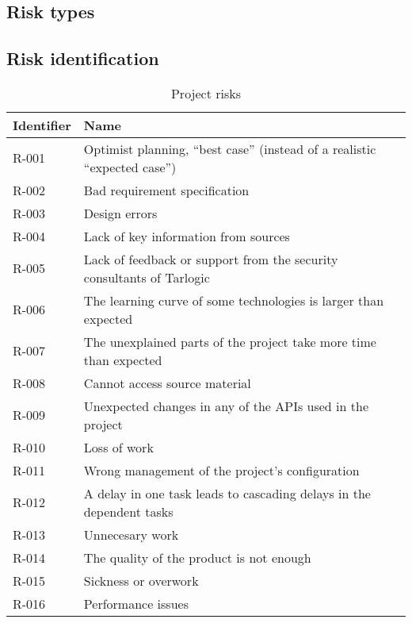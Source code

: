 \subsection{Risk types}

\subsection{Risk identification}

\begin{table}[H]
	\caption{Project risks}
	\begin{tabularx}{\textwidth}{|l|X|}
		\hline
		\rowcolor{gray!30}
		Identifier & Name \\ \hline
		R-001 & Optimist planning, ``best case'' (instead of a realistic ``expected case'')\\ \hline
		R-002 & Bad requirement specification\\ \hline
		R-003 & Design errors\\ \hline

		R-004 & Lack of key information from sources\\ \hline 		%
		R-005 & Lack of feedback or support from the security consultants of Tarlogic\\ \hline 		%
		R-006 & The learning curve of some technologies is larger than expected\\ \hline
		R-007 & The unexplained parts of the project take more time than expected\\ \hline

		R-008 & Cannot access source material\\ \hline 		%
		R-009 & Unexpected changes in any of the APIs used in the project\\ \hline

		R-010 & Loss of work\\ \hline 	%
		R-011 & Wrong management of the project's configuration\\ \hline 	%
		R-012 & A delay in one task leads to cascading delays in the dependent tasks\\ \hline

		R-013 & Unnecesary work\\ \hline 		%
		R-014 & The quality of the product is not enough\\ \hline 	%
		R-015 & Sickness or overwork\\ \hline
		R-016 & Performance issues\\ \hline 	%
	\end{tabularx}
\end{table}





